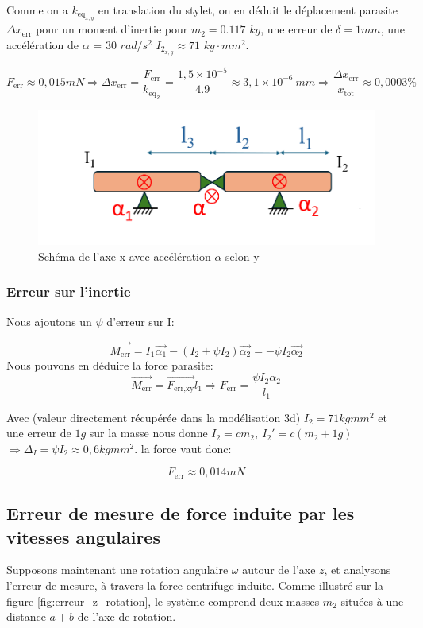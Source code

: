 \documentclass[a4paper, 11pt]{article} %
\begin{document}
 Comme on a $k_{\text{eq}_{x,y}}$ en translation du stylet, on en déduit le déplacement parasite  $\Delta x_\text{err}$ pour un moment d'inertie pour $m_\text{2}=0.117$ $kg$, une erreur de $\delta = 1mm$, une accélération de $\alpha$ = 30 $rad/s^2$ $I_{\text{2}_{x,y}}\approx71$ $kg\cdot mm^2$.

 $$F_\text{err} \approx 0,015mN \Rightarrow \Delta x_\text{err} = \frac{{F_\text{err}}}{k_{\text{eq}_Z}} =\frac{1,5\times10^{-5}}{4.9}\approx 3,1\times 10^{-6} \ mm \Rightarrow \frac{\Delta x_\text{err}}{x_\text{tot}} \approx 0,0003 \% $$



 \begin{figure}[H]
    \centering
    \includegraphics[width=0.6\linewidth]{images/erreur_rotation_xy.png}
    \caption{Schéma de l'axe x avec accélération $\alpha$ selon y}
    \label{fig:erreur_xy_rotation}
\end{figure}
\subsubsection*{Erreur sur l'inertie}
Nous ajoutons un $\psi$ d'erreur sur I:

$$\vec{M_\text{err}} = I_1\vec{\alpha_\text{1}} - (I_2 + \psi I_2)\vec{\alpha_\text{2}} = -\psi I_2\vec{\alpha_\text{2}}$$
Nous pouvons en déduire la force parasite: 
$$\vec{M_\text{err}} =\vec{F_\text{err,xy}}l_\text{1} \Rightarrow F_\text{err} = \frac{
 \psi I_2\alpha_2}{l_\text{1}} $$
 
Avec (valeur directement récupérée dans la modélisation 3d) $I_2 = 71kgmm^2$ et une erreur de $1g$ sur la masse nous donne $I_2 = cm_2, \ I_2'=c(m_2 + 1g)$ $ \Rightarrow \Delta_I = \psi I_2 \approx 0,6 kgmm^2 $. la force vaut donc:

 $$F_\text{err} \approx 0,014mN$$



 
\subsection{Erreur de mesure de force induite par les vitesses angulaires}

Supposons maintenant une rotation angulaire $ \omega $ autour de l’axe $z$, et analysons l’erreur de mesure, à travers la force centrifuge induite. Comme illustré sur la figure \ref{fig:erreur_z_rotation}, le système comprend deux masses $m_2$ situées à une distance $a+b$ de l’axe de rotation.
\end{document}
